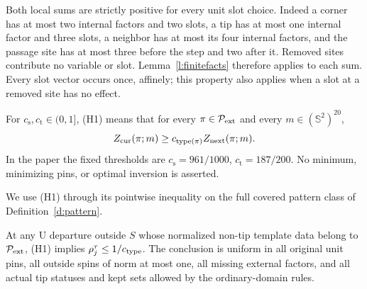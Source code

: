 Both local sums are strictly positive for every unit slot choice.
Indeed a corner has at most two internal factors and two slots,
a tip has at most one internal factor and three slots, a neighbor
has at most its four internal factors, and the passage site has
at most three before the step and two after it. Removed sites
contribute no variable or slot. Lemma~\ref{l:finitefacts}
therefore applies to each sum. Every slot vector occurs once,
affinely; this property also applies when a slot at a removed site
has no effect.

\begin{definition}[(H1)]\label{h:H1}
For \(c_{\mathrm s},c_{\mathrm t}\in(0,1]\), (H1) means that
for every \(\pi\in\mathcal P_{\rm ext}\) and every
\(m\in(\mathbb S^2)^{20}\),
\[
 Z_{\rm cur}(\pi;m)\ge c_{\rm type(\pi)}Z_{\rm next}(\pi;m).
\]
In the paper the fixed thresholds are
\(c_{\mathrm s}=961/1000\), \(c_{\mathrm t}=187/200\).
No minimum, minimizing pins, or optimal inversion is asserted.
\end{definition}

We use (H1) through its pointwise inequality on the full covered
pattern class of Definition~\ref{d:pattern}.

\begin{lemma}\label{l:local}
At any \(\mathrm U\) departure outside \(S\) whose normalized
non-tip template data belong to \(\mathcal P_{\rm ext}\), (H1)
implies \(\rho_j^\tau\le1/c_{\rm type}\).
The conclusion is uniform in all original unit pins, all outside
spins of norm at most one, all missing external factors, and all
actual tip statuses and kept sets allowed by the ordinary-domain rules.
\end{lemma}

